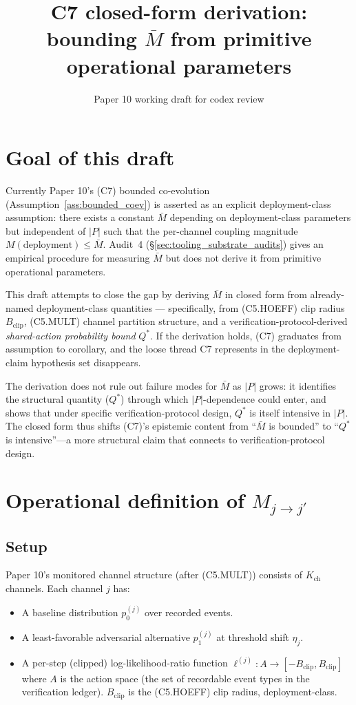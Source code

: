 \documentclass{article}
\title{C7 closed-form derivation: bounding $\bar{M}$ from primitive operational parameters}
\author{Paper 10 working draft for codex review}
\date{}
\newcommand{\Bclip}{B_{\mathrm{clip}}}
\newcommand{\Kch}{K_{\mathrm{ch}}}
\begin{document}
\maketitle

\section{Goal of this draft}

Currently Paper 10's (C7) bounded co-evolution
(Assumption~\ref{ass:bounded_coev}) is asserted as an explicit
deployment-class assumption: there exists a constant $\bar{M}$
depending on deployment-class parameters but independent of $|P|$
such that the per-channel coupling magnitude
$M(\mathrm{deployment}) \leq \bar{M}$.  Audit~4
(\S\ref{sec:tooling_substrate_audits}) gives an empirical procedure
for measuring $\bar{M}$ but does not derive it from primitive
operational parameters.

This draft attempts to close the gap by deriving $\bar{M}$ in
closed form from already-named deployment-class quantities ---
specifically, from (C5.HOEFF) clip radius $\Bclip$, (C5.MULT)
channel partition structure, and a verification-protocol-derived
\emph{shared-action probability bound} $Q^*$.  If the derivation
holds, (C7) graduates from assumption to corollary, and the loose
thread C7 represents in the deployment-claim hypothesis set
disappears.

The derivation does not rule out failure modes for $\bar{M}$ as
$|P|$ grows: it identifies the structural quantity ($Q^*$)
through which $|P|$-dependence could enter, and shows that under
specific verification-protocol design, $Q^*$ is itself intensive in
$|P|$.  The closed form thus shifts (C7)'s epistemic content from
``$\bar{M}$ is bounded'' to ``$Q^*$ is intensive''---a more
structural claim that connects to verification-protocol design.

\section{Operational definition of \texorpdfstring{$M_{j \to j'}$}{M\_jj'}}

\subsection{Setup}

Paper 10's monitored channel structure (after (C5.MULT)) consists
of $\Kch$ channels.  Each channel $j$ has:
\begin{itemize}
\item A baseline distribution $p_0^{(j)}$ over recorded events.
\item A least-favorable adversarial alternative $p_1^{(j)}$ at
  threshold shift $\eta_j$.
\item A per-step (clipped) log-likelihood-ratio function
  $\ell^{(j)}: A \to [-\Bclip, \Bclip]$ where $A$ is the action
  space (the set of recordable event types in the verification
  ledger).  $\Bclip$ is the (C5.HOEFF) clip radius, deployment-class.
\end{itemize}
\end{document}
